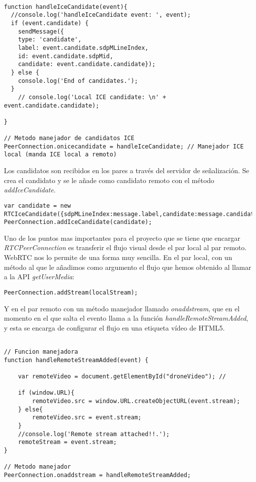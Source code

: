 \begin{lstlisting}[caption=Manejandor de los Candidatos ICE locales.]

function handleIceCandidate(event){
  //console.log('handleIceCandidate event: ', event);
  if (event.candidate) {
    sendMessage({
    type: 'candidate',
    label: event.candidate.sdpMLineIndex,
    id: event.candidate.sdpMid,
    candidate: event.candidate.candidate});
  } else {
    console.log('End of candidates.');
  }
    // console.log('Local ICE candidate: \n' + event.candidate.candidate);
  
}

// Metodo manejador de candidatos ICE
PeerConnection.onicecandidate = handleIceCandidate; // Manejador ICE local (manda ICE local a remoto)

\end{lstlisting}

Los candidatos son recibidos en los pares a través del servidor de señalización. Se crea el candidato y se le añade como candidato remoto con el método \emph{addIceCandidate}.\\

\begin{lstlisting}[caption=Manejandor de los Candidatos ICE remotos.]
var candidate = new RTCIceCandidate({sdpMLineIndex:message.label,candidate:message.candidate});
PeerConnection.addIceCandidate(candidate);
\end{lstlisting}


Uno de los puntos mas importantes para el proyecto que se tiene que encargar \emph{RTCPeerConnection} es transferir el flujo visual desde el par local al par remoto. WebRTC nos lo permite de una forma muy sencilla. En el par local, con un método al que le añadimos como argumento el flujo que hemos obtenido al llamar a la API \emph{getUserMedia}:\\

\begin{lstlisting}[caption=Manejandor del flujo audiovisual en el par local.]
PeerConnection.addStream(localStream); 
\end{lstlisting}

Y en el par remoto con un método manejador llamado \emph{onaddstream}, que en el momento en el que salta el evento llama a la función \emph{handleRemoteStreamAdded}, y esta se encarga de configurar el flujo en una etiqueta vídeo de HTML5.\\

\begin{lstlisting}[caption=Manejandor del flujo audiovisual en el par remoto.]

// Funcion manejadora
function handleRemoteStreamAdded(event) {

    var remoteVideo = document.getElementById("droneVideo"); // 

	if (window.URL){
		remoteVideo.src = window.URL.createObjectURL(event.stream);
	} else{
		remoteVideo.src = event.stream;
	}
    //console.log('Remote stream attached!!.');
	remoteStream = event.stream;
}

// Metodo manejador 
PeerConnection.onaddstream = handleRemoteStreamAdded;
\end{lstlisting}

